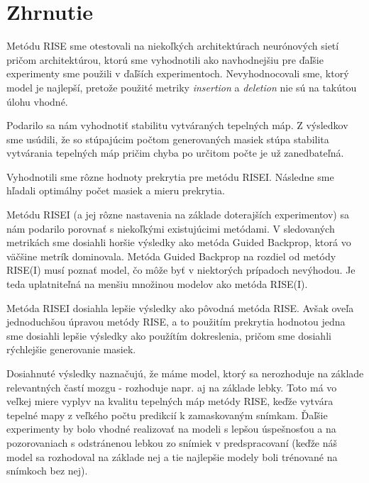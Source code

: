 
\section{Zhrnutie}

Metódu RISE sme otestovali na niekoľkých architektúrach neurónových sietí pričom architektúrou, ktorú sme vyhodnotili ako navhodnejšiu pre ďaľšie experimenty sme použili v ďaľších experimentoch. Nevyhodnocovali sme, ktorý model je najlepší, pretože použité metriky \textit{insertion} a \textit{deletion} nie sú na takútou úlohu vhodné.

Podarilo sa nám vyhodnotiť stabilitu vytváraných tepelných máp. Z výsledkov sme usúdili, že so stúpajúcim počtom generovaných masiek stúpa stabilita vytvárania tepelných máp pričim chyba po určitom počte je už zanedbateľná.

Vyhodnotili sme rôzne hodnoty prekrytia pre metódu RISEI. Následne sme hľadali optimálny počet masiek a mieru prekrytia.

Metódu RISEI (a jej rôzne nastavenia na základe doterajších experimentov) sa nám podarilo porovnať s niekoľkými existujúcimi metódami. V sledovaných metrikách sme dosiahli horšie výsledky ako metóda Guided Backprop, ktorá vo väčšine metrík dominovala.
Metóda Guided Backprop na rozdiel od metódy RISE(I) musí poznať model, čo môže byť v niektorých prípadoch nevýhodou. Je teda uplatniteľná na menšiu množinou modelov ako metóda RISE(I).

Metóda RISEI dosiahla lepšie výsledky ako pôvodná metóda RISE. Avšak oveľa jednoduchšou úpravou metódy RISE, a to použitím prekrytia hodnotou jedna sme dosiahli lepšie výsledky ako použítím dokreslenia, pričom sme dosiahli rýchlejšie generovanie masiek.

Dosiahnuté výsledky naznačujú, že máme model, ktorý sa nerozhoduje na základe relevantných častí mozgu - rozhoduje napr. aj na základe lebky. Toto má vo veľkej miere vyplyv na kvalitu tepelných máp metódy RISE, keďže vytvára tepelné mapy z veľkého počtu predikcií k zamaskovaným snímkam. Ďaľšie experimenty by bolo vhodné realizovať na modeli s lepšou úspešnosťou a na pozorovaniach s odstránenou lebkou zo snímiek v predspracovaní (keďže náš model sa rozhodoval na základe nej a tie najlepšie modely boli trénované na snímkoch bez nej).



